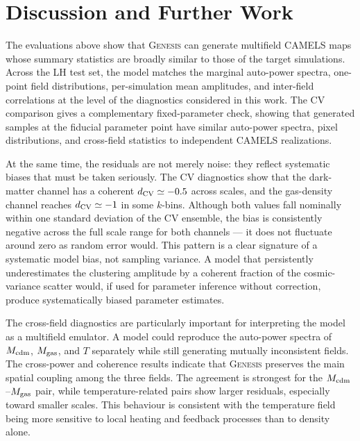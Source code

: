 \documentclass[usenatbib]{mnras}
\newcommand{\Mcdm}{M_{\rm cdm}}
\newcommand{\Mgas}{M_{\rm gas}}
\newcommand{\Tgas}{T}
\begin{document}
\section{Discussion and Further Work}
\label{sec:discussion}

The evaluations above show that \textsc{Genesis} can generate
multifield CAMELS maps whose summary statistics are broadly similar
to those of the target simulations. Across the LH test set, the model
matches the marginal auto-power spectra, one-point field
distributions, per-simulation mean amplitudes, and inter-field
correlations at the level of the diagnostics considered in this work.
The CV comparison gives a complementary fixed-parameter check,
showing that generated samples at the fiducial parameter point have
similar auto-power spectra, pixel distributions, and cross-field
statistics to independent CAMELS realizations.

At the same time, the residuals are not merely noise: they reflect
systematic biases that must be taken seriously. The CV diagnostics
show that the dark-matter channel has a coherent $d_{\rm CV}\simeq
-0.5$ across scales, and the gas-density channel reaches $d_{\rm
CV}\simeq -1$ in some $k$-bins. Although both values fall nominally
within one standard deviation of the CV ensemble, the bias is
consistently negative across the full scale range for both channels
--- it does not fluctuate around zero as random error would. This
pattern is a clear signature of a systematic model bias, not sampling
variance. A model that persistently underestimates the clustering
amplitude by a coherent fraction of the cosmic-variance scatter
would, if used for parameter inference without correction, produce
systematically biased parameter estimates. 

The cross-field diagnostics are particularly important for interpreting
the model as a multifield emulator. A model could reproduce the
auto-power spectra of $\Mcdm$, $\Mgas$, and $\Tgas$ separately while
still generating mutually inconsistent fields. The cross-power and
coherence results indicate that \textsc{Genesis} preserves the main
spatial coupling among the three fields. The agreement is strongest
for the $\Mcdm$--$\Mgas$ pair, while temperature-related pairs show
larger residuals, especially toward smaller scales. This behaviour is
consistent with the temperature field being more sensitive to local
heating and feedback processes than to density alone.
\end{document}
